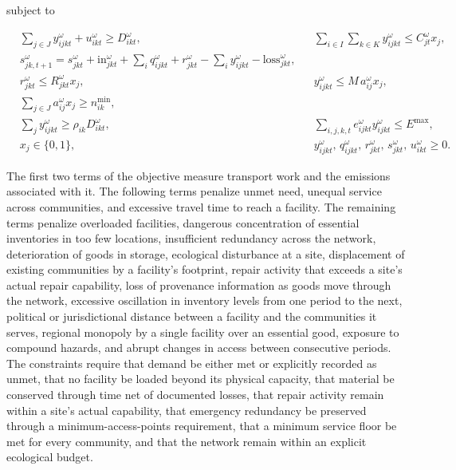 \documentclass[11pt,oneside]{book}
\begin{document}
subject to

\begin{align*}
& \sum_{j \in J} y_{ijkt}^{\omega} + u_{ikt}^{\omega} \geq D_{ikt}^{\omega}, 
&& \sum_{i \in I} \sum_{k \in K} y_{ijkt}^{\omega} \leq C_{jt}^{\omega} x_j, \\
& s_{jk,t+1}^{\omega} = s_{jkt}^{\omega} + \mathrm{in}_{jkt}^{\omega} + \sum_i q_{ijkt}^{\omega} + r_{jkt}^{\omega} - \sum_i y_{ijkt}^{\omega} - \mathrm{loss}_{jkt}^{\omega}, \\
& r_{jkt}^{\omega} \leq R_{jkt}^{\omega} x_j,
&& y_{ijkt}^{\omega} \leq M\, a_{ij}^{\omega} x_j, \\
& \sum_{j \in J} a_{ij}^{\omega} x_j \geq n_{ik}^{\min},
&& \\
& \sum_j y_{ijkt}^{\omega} \geq \rho_{ik} D_{ikt}^{\omega},
&& \sum_{i,j,k,t} e_{ijkt}^{\omega} y_{ijkt}^{\omega} \leq E^{\max}, \\
& x_j \in \{0,1\}, 
&& y_{ijkt}^{\omega},\, q_{ijkt}^{\omega},\, r_{jkt}^{\omega},\, s_{jkt}^{\omega},\, u_{ikt}^{\omega} \geq 0.
\end{align*}

The first two terms of the objective measure transport work and the emissions associated with it. The following terms penalize unmet need, unequal service across communities, and excessive travel time to reach a facility. The remaining terms penalize overloaded facilities, dangerous concentration of essential inventories in too few locations, insufficient redundancy across the network, deterioration of goods in storage, ecological disturbance at a site, displacement of existing communities by a facility's footprint, repair activity that exceeds a site's actual repair capability, loss of provenance information as goods move through the network, excessive oscillation in inventory levels from one period to the next, political or jurisdictional distance between a facility and the communities it serves, regional monopoly by a single facility over an essential good, exposure to compound hazards, and abrupt changes in access between consecutive periods. The constraints require that demand be either met or explicitly recorded as unmet, that no facility be loaded beyond its physical capacity, that material be conserved through time net of documented losses, that repair activity remain within a site's actual capability, that emergency redundancy be preserved through a minimum-access-points requirement, that a minimum service floor be met for every community, and that the network remain within an explicit ecological budget.
\end{document}
